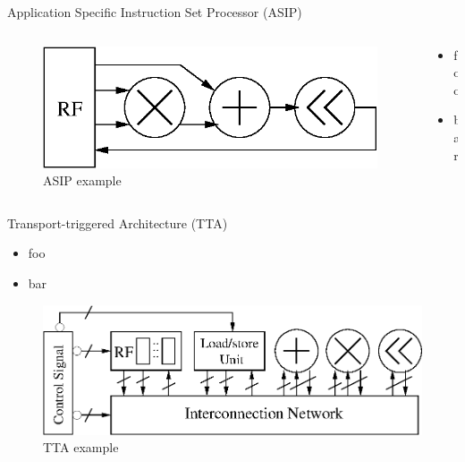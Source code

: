\documentclass{beamer}
\begin{document}
\begin{CJK}{UTF8}{bkai}
    \begin{frame}{Application Specific Instruction Set Processor (ASIP)}
        \begin{columns}
            \begin{column}{0.5\textwidth}
                \begin{figure}[!ht]
                    \centering
                    \includegraphics[width=0.9\linewidth]{./figs/cascade.eps}
                    \caption{ASIP example}
                \end{figure}
            \end{column}
            \begin{column}{0.5\textwidth}
               \begin{itemize}
                   \item foo
                   \item bar
               \end{itemize} 
            \end{column}
        \end{columns} 
    \end{frame}
    \begin{frame}{Transport-triggered Architecture (TTA)}
        \begin{itemize}
            \item foo
            \item bar
        \end{itemize}
        \begin{figure}[!ht]
            \centering
            \includegraphics[width=0.6\linewidth]{./figs/tta.eps}
            \caption{TTA example}
        \end{figure}
    \end{frame}


\end{CJK}
\end{document}
